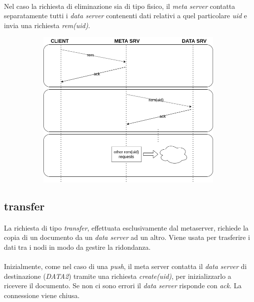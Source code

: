 \documentclass[11pt,a4paper,english]{article}
\begin{document}
\paragraph{} Nel caso la richiesta di eliminazione sia di tipo fisico, il \emph{meta server} contatta separatamente tutti i \emph{data server} contenenti dati relativi a quel particolare \emph{uid} e invia una richiesta \emph{rem(uid)}.  

\begin{figure}[H]
	\centering
	\begin{subfigure}{0.80\linewidth}
		\includegraphics[width=\linewidth]{../diagrams/requests/rem_request.png}
	\end{subfigure}
\end{figure}



\subsection{transfer}

\paragraph{} La richiesta di tipo \emph{transfer}, effettuata esclusivamente dal metaserver, richiede la copia di un documento da un \emph{data server} ad un altro. Viene usata per trasferire i dati tra i nodi in modo da gestire la ridondanza.

\paragraph{} Inizialmente, come nel caso di una \emph{push}, il meta server contatta il \emph{data server} di destinazione (\emph{DATA2}) tramite una richiesta \emph{create(uid)}, per inizializzarlo a ricevere il documento. Se non ci sono errori il \emph{data server} risponde con \emph{ack}. La connessione viene chiusa. 
\end{document}
